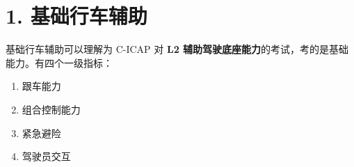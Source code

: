 \section{1. 基础行车辅助}

基础行车辅助可以理解为 C-ICAP 对 \textbf{L2 辅助驾驶底座能力}的考试，考的是基础能力。有四个一级指标：

\begin{enumerate}
  \item 跟车能力
  \item 组合控制能力
  \item 紧急避险
  \item 驾驶员交互
\end{enumerate}
